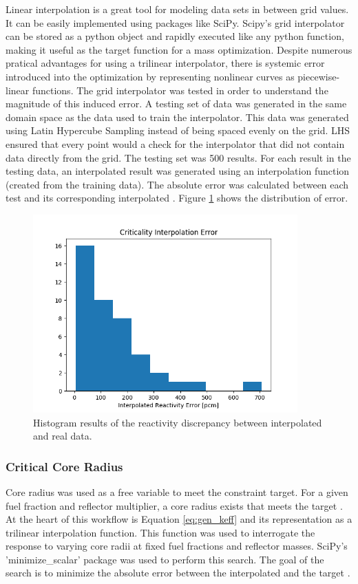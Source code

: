 Linear interpolation is a great tool for modeling data sets in between grid
values. It can be easily implemented using packages like SciPy. Scipy's grid
interpolator can be stored as a python object and rapidly executed like any
python function, making it useful as the target function for a mass
optimization. Despite numerous pratical advantages for using a trilinear
interpolator, there is systemic error introduced into the optimization by
representing nonlinear curves as piecewise-linear functions. The grid
interpolator was tested in order to understand the magnitude of this induced
error. A testing set of data was generated in the same domain space as the data
used to train the interpolator. This data was generated using Latin Hypercube
Sampling instead of being spaced evenly on the grid. LHS ensured that every
point would a check for the interpolator that did not contain data directly from
the grid. The testing set was 500 \keff results. For each \keff result in the
testing data, an interpolated result was generated using an interpolation
function (created from the training data). The absolute error was calculated
between each test \keff and its corresponding interpolated \keff. Figure
\ref{fig:interp_check} shows the distribution of error.

\begin{figure}[h]
    \centering
    \includegraphics[width=4in]{../images/check_interp.png}
\caption{Histogram results of the reactivity discrepancy between interpolated
and real data.}
\label{fig:interp_check}
\end{figure}

\subsubsection{Critical Core Radius}
Core radius was used as a free variable to meet the \keff constraint target. For
a given fuel fraction and reflector multiplier, a core radius exists that meets
the target \keff. At the heart of this workflow is Equation \ref{eq:gen_keff}
and its representation as a trilinear interpolation function. This function was
used to interrogate the \keff response to varying core radii at fixed fuel
fractions and reflector masses. SciPy's 'minimize_scalar' package was used to
perform this search. The goal of the search is to minimize the absolute error
between the interpolated \keff and the target \keff.

